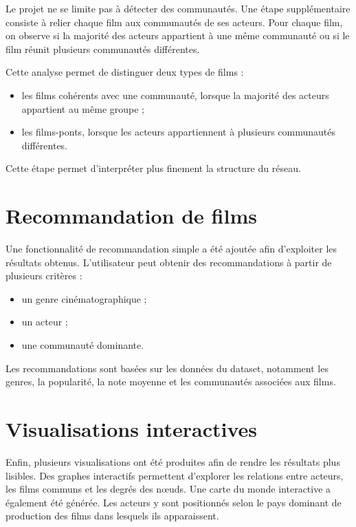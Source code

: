 \documentclass[11pt,a4paper,oneside,openany]{report}
\begin{document}
Le projet ne se limite pas à détecter des communautés. Une étape supplémentaire consiste à relier chaque film aux communautés de ses acteurs. Pour chaque film, on observe si la majorité des acteurs appartient à une même communauté ou si le film réunit plusieurs communautés différentes.

Cette analyse permet de distinguer deux types de films :

\begin{itemize}
    \item les films cohérents avec une communauté, lorsque la majorité des acteurs appartient au même groupe ;
    \item les films-ponts, lorsque les acteurs appartiennent à plusieurs communautés différentes.
\end{itemize}

Cette étape permet d’interpréter plus finement la structure du réseau.

\section{Recommandation de films}

Une fonctionnalité de recommandation simple a été ajoutée afin d’exploiter les résultats obtenus. L’utilisateur peut obtenir des recommandations à partir de plusieurs critères :

\begin{itemize}
    \item un genre cinématographique ;
    \item un acteur ;
    \item une communauté dominante.
\end{itemize}

Les recommandations sont basées sur les données du dataset, notamment les genres, la popularité, la note moyenne et les communautés associées aux films.

\section{Visualisations interactives}

Enfin, plusieurs visualisations ont été produites afin de rendre les résultats plus lisibles. Des graphes interactifs permettent d’explorer les relations entre acteurs, les films communs et les degrés des nœuds. Une carte du monde interactive a également été générée. Les acteurs y sont positionnés selon le pays dominant de production des films dans lesquels ils apparaissent.
\end{document}
